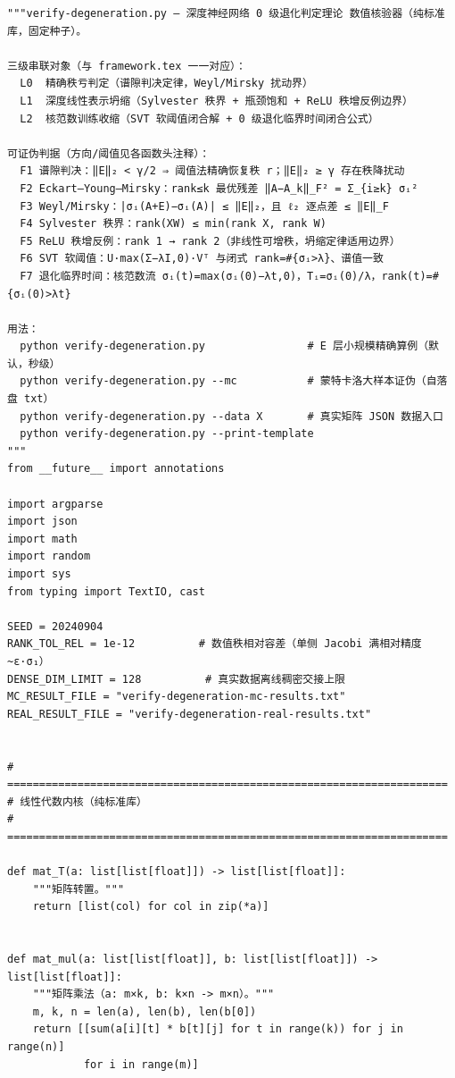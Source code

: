 \documentclass[UTF8,11pt,a4paper]{ctexart}
\theoremstyle{plain}
\theoremstyle{definition}
\theoremstyle{remark}
\begin{document}
\begin{Verbatim}[fontsize=\scriptsize,frame=single,breaklines=true,breakanywhere=true,breaksymbolleft={}]
"""verify-degeneration.py — 深度神经网络 0 级退化判定理论 数值核验器（纯标准库，固定种子）。

三级串联对象（与 framework.tex 一一对应）：
  L0  精确秩亏判定（谱隙判决定律，Weyl/Mirsky 扰动界）
  L1  深度线性表示坍缩（Sylvester 秩界 + 瓶颈饱和 + ReLU 秩增反例边界）
  L2  核范数训练收缩（SVT 软阈值闭合解 + 0 级退化临界时间闭合公式）

可证伪判据（方向/阈值见各函数头注释）：
  F1 谱隙判决：‖E‖₂ < γ/2 ⇒ 阈值法精确恢复秩 r；‖E‖₂ ≥ γ 存在秩降扰动
  F2 Eckart–Young–Mirsky：rank≤k 最优残差 ‖A−A_k‖_F² = Σ_{i≥k} σᵢ²
  F3 Weyl/Mirsky：|σᵢ(A+E)−σᵢ(A)| ≤ ‖E‖₂，且 ℓ₂ 逐点差 ≤ ‖E‖_F
  F4 Sylvester 秩界：rank(XW) ≤ min(rank X, rank W)
  F5 ReLU 秩增反例：rank 1 → rank 2（非线性可增秩，坍缩定律适用边界）
  F6 SVT 软阈值：U·max(Σ−λI,0)·Vᵀ 与闭式 rank=#{σᵢ>λ}、谱值一致
  F7 退化临界时间：核范数流 σᵢ(t)=max(σᵢ(0)−λt,0)，Tᵢ=σᵢ(0)/λ，rank(t)=#{σᵢ(0)>λt}

用法：
  python verify-degeneration.py                # E 层小规模精确算例（默认，秒级）
  python verify-degeneration.py --mc           # 蒙特卡洛大样本证伪（自落盘 txt）
  python verify-degeneration.py --data X       # 真实矩阵 JSON 数据入口
  python verify-degeneration.py --print-template
"""
from __future__ import annotations

import argparse
import json
import math
import random
import sys
from typing import TextIO, cast

SEED = 20240904
RANK_TOL_REL = 1e-12          # 数值秩相对容差（单侧 Jacobi 满相对精度 ~ε·σ₁）
DENSE_DIM_LIMIT = 128          # 真实数据离线稠密交接上限
MC_RESULT_FILE = "verify-degeneration-mc-results.txt"
REAL_RESULT_FILE = "verify-degeneration-real-results.txt"


# =====================================================================
# 线性代数内核（纯标准库）
# =====================================================================

def mat_T(a: list[list[float]]) -> list[list[float]]:
    """矩阵转置。"""
    return [list(col) for col in zip(*a)]


def mat_mul(a: list[list[float]], b: list[list[float]]) -> list[list[float]]:
    """矩阵乘法（a: m×k, b: k×n -> m×n）。"""
    m, k, n = len(a), len(b), len(b[0])
    return [[sum(a[i][t] * b[t][j] for t in range(k)) for j in range(n)]
            for i in range(m)]



\end{Verbatim}
\end{document}
